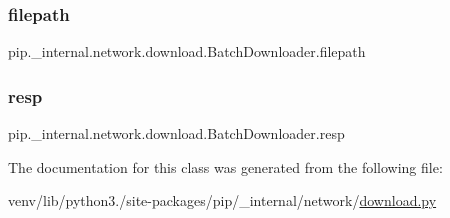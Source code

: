 \subsubsection{\texorpdfstring{filepath}{filepath}}
{\footnotesize\ttfamily pip.\+\_\+internal.\+network.\+download.\+Batch\+Downloader.\+filepath\hspace{0.3cm}{\ttfamily [static]}}

\mbox{\label{classpip_1_1__internal_1_1network_1_1download_1_1BatchDownloader_af086166cf20109906753159b1c462f72}} 
\subsubsection{\texorpdfstring{resp}{resp}}
{\footnotesize\ttfamily pip.\+\_\+internal.\+network.\+download.\+Batch\+Downloader.\+resp\hspace{0.3cm}{\ttfamily [static]}}



The documentation for this class was generated from the following file\+:\begin{DoxyCompactItemize}
\item 
venv/lib/python3./site-\/packages/pip/\+\_\+internal/network/\hyperlink{network_2download_8py}{download.\+py}\end{DoxyCompactItemize}
